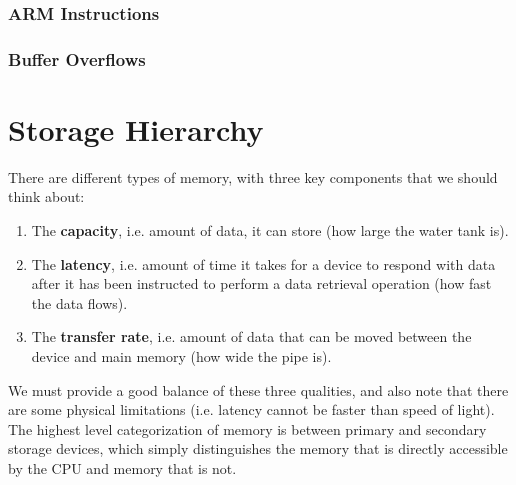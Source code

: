 \documentclass{article}
\begin{document}
    \subsubsection{ARM Instructions}

      

    \subsubsection{Buffer Overflows}

\section{Storage Hierarchy}

    There are different types of memory, with three  key components that we should think about: 
    \begin{enumerate}
      \item The \textbf{capacity}, i.e. amount of data, it can store (how large the water tank is). 
      \item The \textbf{latency}, i.e. amount of time it takes for a device to respond with data after it has been instructed to perform a data retrieval operation (how fast the data flows). 
      \item The \textbf{transfer rate}, i.e. amount of data that can be moved between the device and main memory (how wide the pipe is). 
    \end{enumerate}

    We must provide a good balance of these three qualities, and also note that there are some physical limitations (i.e. latency cannot be faster than speed of light). The highest level categorization of memory is between primary and secondary storage devices, which simply distinguishes the memory that is directly accessible by the CPU and memory that is not. 
\end{document}
